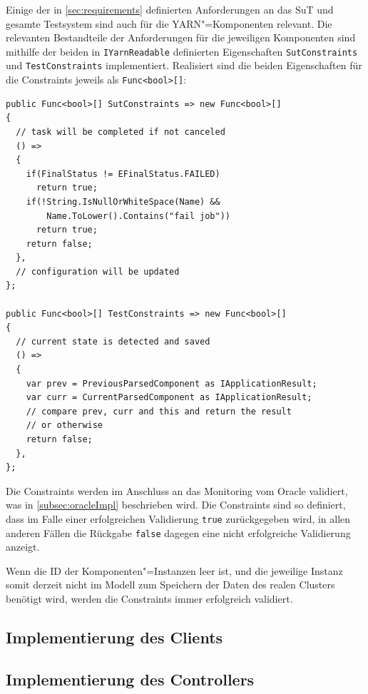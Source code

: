 Einige der in \cref{sec:requirements} definierten Anforderungen an das \ac{SuT} und gesamte Testsystem sind auch für die \ac{YARN}"=Komponenten relevant.
Die relevanten Bestandteile der Anforderungen für die jeweiligen Komponenten sind mithilfe der beiden in \texttt{IYarnReadable} definierten Eigenschaften \texttt{SutConstraints} und \texttt{TestConstraints} implementiert.
Realisiert sind die beiden Eigenschaften für die Constraints jeweils als \texttt{Func<bool>[]}:

\begin{lstlisting}[label=lst:constraintDefinition,style=cs,
caption={[Definition der Constraints in YarnApp]
    Definition der Constraints in \texttt{YarnApp} (gekürzt)}]
public Func<bool>[] SutConstraints => new Func<bool>[]
{
  // task will be completed if not canceled
  () =>
  {
    if(FinalStatus != EFinalStatus.FAILED)
      return true;
    if(!String.IsNullOrWhiteSpace(Name) &&
        Name.ToLower().Contains("fail job"))
      return true;
    return false;
  },
  // configuration will be updated
};

public Func<bool>[] TestConstraints => new Func<bool>[]
{
  // current state is detected and saved
  () =>
  {
    var prev = PreviousParsedComponent as IApplicationResult;
    var curr = CurrentParsedComponent as IApplicationResult;
    // compare prev, curr and this and return the result
    // or otherwise
    return false;
  },
};
\end{lstlisting}

Die Constraints werden im Anschluss an das Monitoring vom Oracle validiert, was in \cref{subsec:oracleImpl} beschrieben wird.
Die Constraints sind so definiert, dass im Falle einer erfolgreichen Validierung \texttt{true} zurückgegeben wird, in allen anderen Fällen die Rückgabe \texttt{false} dagegen eine nicht erfolgreiche Validierung anzeigt.

Wenn die ID der Komponenten"=Instanzen leer ist, und die jeweilige Instanz somit derzeit nicht im Modell zum Speichern der Daten des realen Clusters benötigt wird, werden die Constraints immer erfolgreich validiert.

\subsection{Implementierung des Clients}
\label{subsec:yarnClient}

\subsection{Implementierung des Controllers}
\label{subsec:yarnController}


